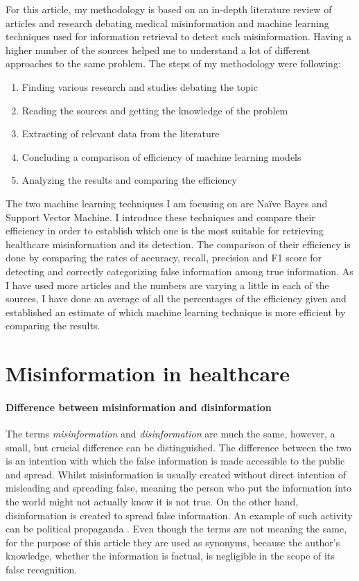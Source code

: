 \documentclass[11pt ,english,a4paper]{article}
\begin{document}
For this article, my methodology is based on an in-depth literature review of articles and research debating medical misinformation and machine learning techniques used for information retrieval to detect such misinformation. Having a higher number of the sources helped me  to understand a lot of different approaches to the same problem. 
The steps of my methodology were following:
\begin{enumerate}[itemsep=-5pt]
\item{Finding various research and studies debating the topic}
\item{Reading the sources and getting the knowledge of the problem}
\item{Extracting of relevant data from the literature}
\item{Concluding a comparison of efficiency of machine learning models}
\item{Analyzing the results and comparing the efficiency}
\end{enumerate}
 The two machine learning techniques I am focusing on are Naïve Bayes and Support Vector Machine. I introduce these techniques and compare their efficiency in order to establish which one is the most suitable for retrieving healthcare misinformation and its detection. The comparison of their efficiency is done by comparing the rates of accuracy, recall, precision and F1 score for detecting and correctly categorizing false information among true information. As I have used more articles and the numbers are varying a little in each of the sources, I have done an average of all the percentages of the efficiency given and established an estimate of which machine learning technique is more efficient by comparing the results.

\section{Misinformation in healthcare}\label{mih}

\paragraph{Difference between misinformation and disinformation}
The terms \emph{misinformation} and \emph{disinformation} are much the same, however, a small, but crucial difference can be distinguished. The difference between the two is an intention with which the false information is made accessible to the public and spread. Whilst misinformation is usually created without direct intention of misleading and spreading false, meaning the person who put the information into the world might not actually know it is not true. On the other hand, disinformation is created to spread false information. An example of such activity can be political propaganda \cite{gu20misinfo} \cite{cook15misinfo}. Even though the terms are not meaning the same, for the purpose of this article they are used as synonyms, because the author's knowledge, whether the information is factual, is negligible in the scope of its false recognition.
\end{document}
